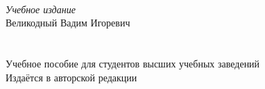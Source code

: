 \newpage
\thispagestyle{empty}
~\vfill
\begin{centering}
  \textit{Учебное издание}\\[18pt]
  Великодный Вадим Игоревич\\[6pt]
  \textsc{\Title}\\[6pt]
  \PubType\\[18pt]
  Учебное пособие для студентов высших учебных заведений\\[18pt]
  Издаётся в авторской редакции\\
\end{centering}
\vspace{3cm}
